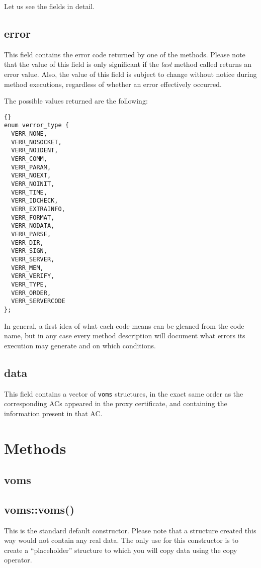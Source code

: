 \documentclass[a4paper]{book}
\begin{document}
Let us see the fields in detail.

\subsection{error}
This field contains the error code returned by one of the methods.
Please note that the value of this field is only significant if the
\emph{last} method called returns an error value.  Also, the value of
this field is subject to change without notice during method
executions, regardless of whether an error effectively occurred.

The possible values returned are the following:\bigskip\bigskip

\begin{lstlisting}{}
enum verror_type { 
  VERR_NONE,
  VERR_NOSOCKET,  
  VERR_NOIDENT,   
  VERR_COMM,      
  VERR_PARAM,     
  VERR_NOEXT,     
  VERR_NOINIT,    
  VERR_TIME,      
  VERR_IDCHECK,   
  VERR_EXTRAINFO, 
  VERR_FORMAT,    
  VERR_NODATA,    
  VERR_PARSE,     
  VERR_DIR,       
  VERR_SIGN,      
  VERR_SERVER,    
  VERR_MEM,       
  VERR_VERIFY,    
  VERR_TYPE,      
  VERR_ORDER,     
  VERR_SERVERCODE 
};
\end{lstlisting}

In general, a first idea of what each code means can be gleaned from
the code name, but in any case every method description will document
what errors its execution may generate and on which conditions.

\subsection{data}
This field contains a vector of \texttt{voms} structures, in the exact
same order as the corresponding ACs appeared in the proxy certificate,
and containing the information present in that AC.

\section{Methods}
\subsection {voms}
\subsection{voms::voms()}
This is the standard default constructor.  Please note that a structure
created this way would not contain any real data.  The only use for this
constructor is to create a ``placeholder'' structure to which you
will copy data using the copy operator.
\end{document}
